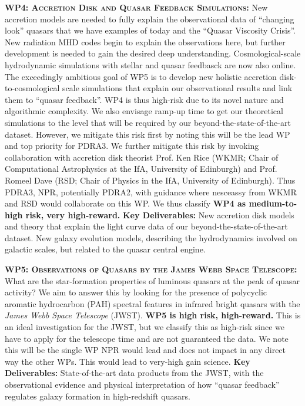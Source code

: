 \documentclass[oneside, a4paper, onecolumn, 11pt]{article}
\begin{document}
\smallskip
\smallskip
\noindent
\textbf{\textsc{WP4: Accretion Disk and Quasar Feedback Simulations:}} 
New accretion models are needed to fully explain the observational
data of ``changing look'' quasars that we have examples of today and
the ``Quasar Viscosity Crisis''. New radiation MHD codes begin to
explain the observations here, but further development is needed to
gain the desired deep understanding. Cosmological-scale hydrodynamic
simulations with stellar and quasar feedbasck are now also online. The
exceedingly ambitious goal of WP5 is to develop new holistic accretion
disk-to-cosmological scale simulations that explain our observational
results and link them to ``quasar feedback''.  WP4 is thus high-risk
due to its novel nature and algorithmic complexity.  We also envisage
ramp-up time to get our theoretical simulations to the level that will
be required by our beyond-the-state-of-the-art dataset.  However, we
mitigate this risk first by noting this will be the lead WP and top
priority for PDRA3.  We further mitigate this risk by invoking
collaboration with accretion disk theorist Prof. Ken Rice (WKMR; Chair
of Computational Astrophysics at the IfA, University of Edinburgh) and
Prof. Romeel Dave (RSD; Chair of Physics in the IfA, University of
Edinburgh).
Thus PDRA3, NPR, potentially PDRA2, with guidance where nesceassy from
WKMR and RSD would collaborate on this WP.  We thus classify {\bf WP4
as medium-to-high risk, very high-reward.}  {\bf Key Deliverables:}
New accretion disk models and theory that explain the light curve data
of our beyond-the-state-of-the-art dataset.  New galaxy evolution
models, describing the hydrodynamics involved on galactic scales, but
related to the quasar central engine.


\smallskip
\smallskip
\noindent
\textbf{\textsc{WP5: Observations of Quasars by the James Webb Space Telescope:}} 
What are the star-formation properties of luminous quasars at the peak
of quasar activity?  We aim to answer this by looking for the presence
of polycyclic aromatic hydrocarbon (PAH) spectral features in infrared
bright quasars with the {\it James Webb Space Telescope} (JWST).  {\bf
WP5 is high risk, high-reward.}  This is an ideal investigation for
the JWST, but we classify this as high-risk since we have to apply for
the telescope time and are not guaranteed the data.  We note this will
be the single WP NPR would lead and does not impact in any direct way
the other WPs. This would lead to very-high gain science.  {\bf Key
Deliverables:} State-of-the-art data products from the JWST,
with the observational evidence and physical interpretation of how
``quasar feedback'' regulates galaxy formation in high-redshift
quasars.
\end{document}
